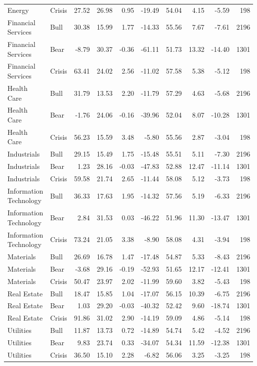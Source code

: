 \begin{landscape}
\begin{longtable}{llrrrrrrrr}
Energy & Crisis & 27.52 & 26.98 & 0.95 & -19.49 & 54.04 & 4.15 & -5.59 & 198 \\
Financial Services & Bull & 30.38 & 15.99 & 1.77 & -14.33 & 55.56 & 7.67 & -7.61 & 2196 \\
Financial Services & Bear & -8.79 & 30.37 & -0.36 & -61.11 & 51.73 & 13.32 & -14.40 & 1301 \\
Financial Services & Crisis & 63.41 & 24.02 & 2.56 & -11.02 & 57.58 & 5.38 & -5.12 & 198 \\
Health Care & Bull & 31.79 & 13.53 & 2.20 & -11.79 & 57.29 & 4.63 & -5.68 & 2196 \\
Health Care & Bear & -1.76 & 24.06 & -0.16 & -39.96 & 52.04 & 8.07 & -10.28 & 1301 \\
Health Care & Crisis & 56.23 & 15.59 & 3.48 & -5.80 & 55.56 & 2.87 & -3.04 & 198 \\
Industrials & Bull & 29.15 & 15.49 & 1.75 & -15.48 & 55.51 & 5.11 & -7.30 & 2196 \\
Industrials & Bear & 1.23 & 28.16 & -0.03 & -47.83 & 52.88 & 12.47 & -11.14 & 1301 \\
Industrials & Crisis & 59.58 & 21.74 & 2.65 & -11.44 & 58.08 & 5.12 & -3.73 & 198 \\
Information Technology & Bull & 36.33 & 17.63 & 1.95 & -14.32 & 57.56 & 5.19 & -6.33 & 2196 \\
Information Technology & Bear & 2.84 & 31.53 & 0.03 & -46.22 & 51.96 & 11.30 & -13.47 & 1301 \\
Information Technology & Crisis & 73.24 & 21.05 & 3.38 & -8.90 & 58.08 & 4.31 & -3.94 & 198 \\
Materials & Bull & 26.69 & 16.78 & 1.47 & -17.48 & 54.87 & 5.33 & -8.43 & 2196 \\
Materials & Bear & -3.68 & 29.16 & -0.19 & -52.93 & 51.65 & 12.17 & -12.41 & 1301 \\
Materials & Crisis & 50.47 & 23.97 & 2.02 & -11.99 & 59.60 & 3.82 & -5.43 & 198 \\
Real Estate & Bull & 18.47 & 15.85 & 1.04 & -17.07 & 56.15 & 10.39 & -6.75 & 2196 \\
Real Estate & Bear & 1.03 & 29.20 & -0.03 & -40.32 & 52.42 & 9.60 & -18.74 & 1301 \\
Real Estate & Crisis & 91.86 & 31.02 & 2.90 & -14.19 & 59.09 & 4.86 & -5.14 & 198 \\
Utilities & Bull & 11.87 & 13.73 & 0.72 & -14.89 & 54.74 & 5.42 & -4.52 & 2196 \\
Utilities & Bear & 9.83 & 23.74 & 0.33 & -34.07 & 54.34 & 11.59 & -12.38 & 1301 \\
Utilities & Crisis & 36.50 & 15.10 & 2.28 & -6.82 & 56.06 & 3.25 & -3.25 & 198 \\
\end{longtable}
\end{landscape}

